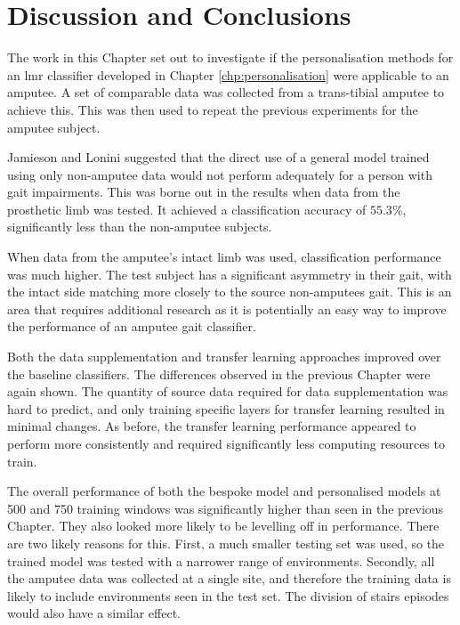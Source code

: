 \section{Discussion and Conclusions}
\label{sec:amputee-discussion}
The work in this Chapter set out to investigate if the personalisation methods for an \acrshort{lmr} classifier developed in Chapter \ref{chp:personalisation} were applicable to an amputee. A set of comparable data was collected from a trans-tibial amputee to achieve this. This was then used to repeat the previous experiments for the amputee subject.

Jamieson and Lonini suggested that the direct use of a general model trained using only non-amputee data would not perform adequately for a person with gait impairments\cite{Lonini2016, Jamieson2021}. This was borne out in the results when data from the prosthetic limb was tested. It achieved a classification accuracy of $55.3\%$, significantly less than the non-amputee subjects.

When data from the amputee's intact limb was used, classification performance was much higher. The test subject has a significant asymmetry in their gait, with the intact side matching more closely to the source non-amputees gait. This is an area that requires additional research as it is potentially an easy way to improve the performance of an amputee gait classifier.

Both the data supplementation and transfer learning approaches improved over the baseline classifiers. The differences observed in the previous Chapter were again shown. The quantity of source data required for data supplementation was hard to predict, and only training specific layers for transfer learning resulted in minimal changes. As before, the transfer learning performance appeared to perform more consistently and required significantly less computing resources to train.

The overall performance of both the bespoke model and personalised models at 500 and 750 training windows was significantly higher than seen in the previous Chapter. They also looked more likely to be levelling off in performance. There are two likely reasons for this. First, a much smaller testing set was used, so the trained model was tested with a narrower range of environments. Secondly, all the amputee data was collected at a single site, and therefore the training data is likely to include environments seen in the test set. The division of stairs episodes would also have a similar effect.

